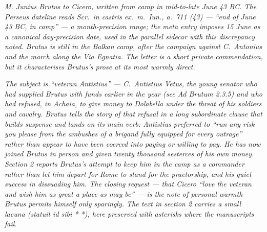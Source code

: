 
\textit{M. Junius Brutus to Cicero, written from camp
in mid-to-late June 43 BC. The Perseus dateline reads
\textit{Scr.\ in castris ex.\ m.\ Iun., a.\ 711 (43)}
--- ``end of June 43 BC, in camp'' --- a month-precision
range; the meta entry imposes 15 June as a canonical
day-precision date, used in the parallel sidecar with
this discrepancy noted. Brutus is still in the Balkan
camp, after the campaign against C.\ Antonius and the
march along the Via Egnatia. The letter is a short
private commendation, but it characterises Brutus's
prose at its most warmly direct.}

\textit{The subject is ``veteran Antistius'' --- C.\
Antistius Vetus, the young senator who had supplied
Brutus with funds earlier in the year (see Ad Brutum
2.3.5) and who had refused, in Achaia, to give money to
Dolabella under the threat of his soldiers and cavalry.
Brutus tells the story of that refusal in a long
subordinate clause that builds suspense and lands on
its main verb: Antistius preferred to ``run any risk
you please from the ambushes of a brigand fully
equipped for every outrage'' rather than appear to have
been coerced into paying or willing to pay. He has now
joined Brutus in person and given twenty thousand
sesterces of his own money. Section 2 reports Brutus's
attempt to keep him in the camp as a commander rather
than let him depart for Rome to stand for the
praetorship, and his quiet success in dissuading him.
The closing request --- that Cicero ``love the veteran
and wish him as great a place as may be'' --- is the
note of personal warmth Brutus permits himself only
sparingly. The text in section 2 carries a small lacuna
(\textit{statuit id sibi * *}), here preserved with
asterisks where the manuscripts fail.}
